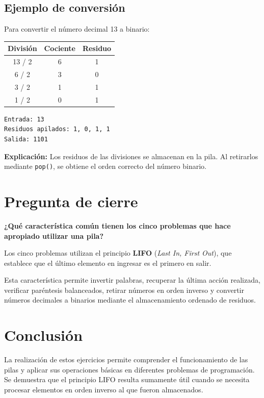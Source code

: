 \documentclass[11pt, a4paper]{article}
\begin{document}
\subsection*{Ejemplo de conversión}

Para convertir el número decimal 13 a binario:

\begin{center}
\begin{tabular}{|c|c|c|}
\hline
\textbf{División} & \textbf{Cociente} & \textbf{Residuo} \\
\hline
13 / 2 & 6 & 1 \\
6 / 2 & 3 & 0 \\
3 / 2 & 1 & 1 \\
1 / 2 & 0 & 1 \\
\hline
\end{tabular}
\end{center}

\begin{verbatim}
Entrada: 13
Residuos apilados: 1, 0, 1, 1
Salida: 1101
\end{verbatim}

\textbf{Explicación:} Los residuos de las divisiones se almacenan en la pila. Al retirarlos mediante \texttt{pop()}, se obtiene el orden correcto del número binario.

\vspace{0.8cm}

\section*{\color{mainnavy}Pregunta de cierre}

\textbf{¿Qué característica común tienen los cinco problemas que hace apropiado utilizar una pila?}

Los cinco problemas utilizan el principio \textbf{LIFO} (\textit{Last In, First Out}), que establece que el último elemento en ingresar es el primero en salir.

Esta característica permite invertir palabras, recuperar la última acción realizada, verificar paréntesis balanceados, retirar números en orden inverso y convertir números decimales a binarios mediante el almacenamiento ordenado de residuos.

\vspace{0.8cm}

\section*{\color{mainnavy}Conclusión}

La realización de estos ejercicios permite comprender el funcionamiento de las pilas y aplicar sus operaciones básicas en diferentes problemas de programación. Se demuestra que el principio LIFO resulta sumamente útil cuando se necesita procesar elementos en orden inverso al que fueron almacenados.
\end{document}
